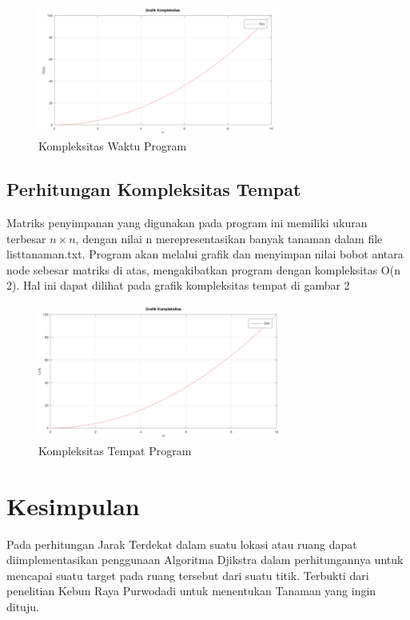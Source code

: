 \documentclass[conference]{IEEEtran}
\begin{document}
\begin{figure} [htbp]
    \includegraphics[width=8cm]{gambar/Kompleksitas Waktu Program.png}
    \centering
    \caption{Kompleksitas Waktu Program}
\end{figure}

\subsection{Perhitungan Kompleksitas Tempat}
Matriks penyimpanan yang digunakan pada program ini
memiliki ukuran terbesar $n \times n$, dengan nilai n merepresentasikan banyak tanaman dalam file listtanaman.txt. Program
akan melalui grafik dan menyimpan nilai bobot antara node
sebesar matriks di atas, mengakibatkan program dengan kompleksitas O(n
2). Hal ini dapat dilihat pada grafik kompleksitas
tempat di gambar 2

\begin{figure} [htbp]
    \includegraphics[width=8cm]{gambar/Kompleksitas Tempat Program.png}
    \centering
    \caption{Kompleksitas Tempat Program}
\end{figure}

\section{Kesimpulan}
Pada perhitungan Jarak Terdekat dalam suatu lokasi atau ruang dapat diimplementasikan penggunaan Algoritma Djikstra
dalam perhitungannya untuk mencapai suatu target pada ruang tersebut dari suatu titik. Terbukti dari penelitian Kebun Raya
Purwodadi untuk menentukan Tanaman yang ingin dituju.




\end{document}
